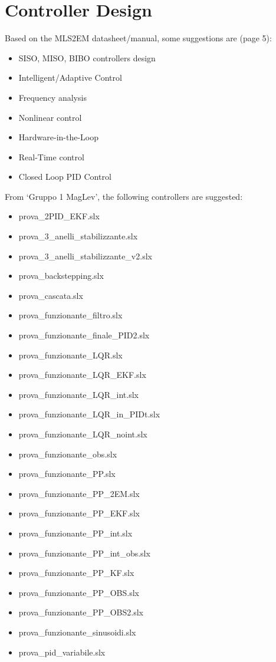 \section{Controller Design}
\label{sec:controller_design}

Based on the MLS2EM datasheet/manual, some suggestions are (page 5):

\begin{itemize}
    \item SISO, MISO, BIBO controllers design
    \item Intelligent/Adaptive Control
    \item Frequency analysis
    \item Nonlinear control
    \item Hardware-in-the-Loop
    \item Real-Time control
    \item Closed Loop PID Control
\end{itemize}

From `Gruppo 1 MagLev', the following controllers are suggested:

\begin{itemize}
    \item prova\_2PID\_EKF.slx
    \item prova\_3\_anelli\_stabilizzante.slx
    \item prova\_3\_anelli\_stabilizzante\_v2.slx
    \item prova\_backstepping.slx
    \item prova\_cascata.slx
    \item prova\_funzionante\_filtro.slx
    \item prova\_funzionante\_finale\_PID2.slx
    \item prova\_funzionante\_LQR.slx
    \item prova\_funzionante\_LQR\_EKF.slx
    \item prova\_funzionante\_LQR\_int.slx
    \item prova\_funzionante\_LQR\_in\_PIDt.slx
    \item prova\_funzionante\_LQR\_noint.slx
    \item prova\_funzionante\_obs.slx
    \item prova\_funzionante\_PP.slx
    \item prova\_funzionante\_PP\_2EM.slx
    \item prova\_funzionante\_PP\_EKF.slx
    \item prova\_funzionante\_PP\_int.slx
    \item prova\_funzionante\_PP\_int\_obs.slx
    \item prova\_funzionante\_PP\_KF.slx
    \item prova\_funzionante\_PP\_OBS.slx
    \item prova\_funzionante\_PP\_OBS2.slx
    \item prova\_funzionante\_sinusoidi.slx
    \item prova\_pid\_variabile.slx
\end{itemize}

